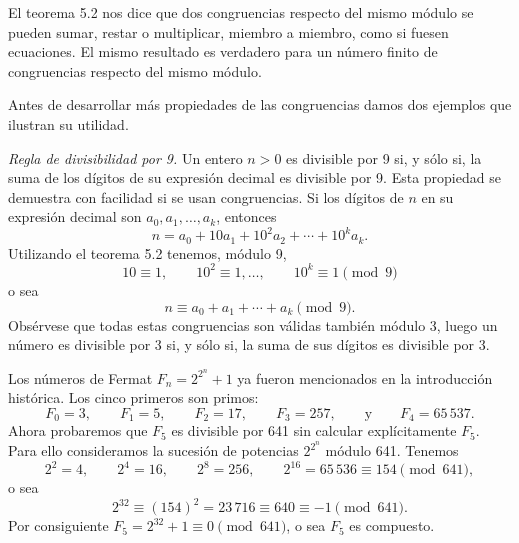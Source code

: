 \documentclass[12pt,a4paper]{book}
\begin{document}
    El teorema 5.2 nos dice que dos congruencias respecto del mismo módulo se pueden
    sumar, restar o multiplicar, miembro a miembro, como si fuesen ecuaciones. El mismo
    resultado es verdadero para un número finito de congruencias respecto del mismo
    módulo.

    Antes de desarrollar más propiedades de las congruencias damos dos ejemplos que
    ilustran su utilidad.

    \begin{ejemplo}
        \textit{Regla de divisibilidad por 9.} Un entero $n>0$ es divisible por 9 si, y
        sólo si, la suma de los dígitos de su expresión decimal es divisible por 9. Esta
        propiedad se demuestra con facilidad si se usan congruencias. Si los dígitos de
        $n$ en su expresión decimal son $a_{0},a_{1},\dots,a_{k}$, entonces
        \begin{equation*}
            n=a_{0}+10a_{1}+10^{2}a_{2}+\cdots+10^{k}a_{k}.
        \end{equation*}
        Utilizando el teorema 5.2 tenemos, módulo 9,
        \begin{equation*}
            10\equiv1,\qquad10^{2}\equiv1,\dots,\qquad10^{k}\equiv1\pmod{9}
        \end{equation*}
        o sea
        \begin{equation*}
            n\equiv a_{0}+a_{1}+\cdots+a_{k}\pmod{9}.
        \end{equation*}
        Obsérvese que todas estas congruencias son válidas también módulo 3, luego un
        número es divisible por 3 si, y sólo si, la suma de sus dígitos es divisible
        por 3.
    \end{ejemplo}

    \begin{ejemplo}
        Los números de Fermat $F_{n}=2^{2^{n}}+1$ ya fueron mencionados en la introducción
        histórica. Los cinco primeros son primos:
        \begin{equation*}
            F_{0}=3,\qquad F_{1}=5,\qquad F_{2}=17,\qquad F_{3}=257,\qquad\text{y}\qquad
            F_{4}=65\,537.
        \end{equation*}
        Ahora probaremos que $F_{5}$ es divisible por 641 sin calcular explícitamente
        $F_{5}$. Para ello consideramos la sucesión de potencias $2^{2^{n}}$ módulo 641.
        Tenemos
        \begin{equation*}
            2^{2}=4,\qquad2^{4}=16,\qquad2^{8}=256,\qquad2^{16}=65\,536\equiv154\pmod{641},
        \end{equation*}
        o sea
        \begin{equation*}
            2^{32}\equiv(154)^{2}=23\,716\equiv640\equiv-1\pmod{641}.
        \end{equation*}
        Por consiguiente $F_{5}=2^{32}+1\equiv0\pmod{641}$, o sea $F_{5}$ es compuesto.
    \end{ejemplo}
\end{document}
